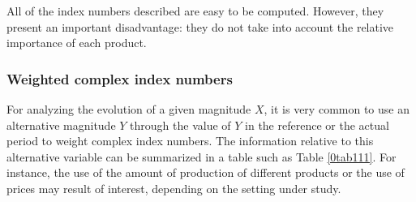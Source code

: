 \small{
	\begin{table}[h!]\centering{}\caption{Non-weighted complex price indexes in chain for the unitary value of combustibles and energy resources for the main home in Spain from
			2006 to 2015.}\label{tab11100002_2}\end{table}
}

All of the index numbers described are easy to be computed. However, they present an important disadvantage: they do not take into account the relative importance of each product.


\subsubsection{Weighted complex index numbers}

For analyzing the evolution of a given magnitude $X$, it is very common to use an alternative magnitude $Y$ through the value of $Y$ in the reference or the actual period to weight complex index numbers.  The information relative to this alternative variable can be summarized in a table such as Table \ref{0tab111}. For instance,  the use of the amount of production of different products or the use of prices may result of interest, depending on the setting under study.

